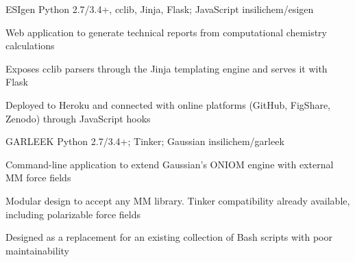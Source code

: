 \begin{cventries}
  \projectentry
    {ESIgen} %
    {Python 2.7/3.4+, cclib, Jinja, Flask; JavaScript} %
    {} %
    {insilichem/esigen} %
    {
      \begin{cvitems} %
        \item {Web application to generate technical reports from computational chemistry calculations}
        \item {Exposes cclib parsers through the Jinja templating engine and serves it with Flask}
        \item {Deployed to Heroku and connected with online platforms (GitHub, FigShare, Zenodo) through JavaScript hooks}
      \end{cvitems}
    }

  \projectentry
    {GARLEEK} %
    {Python 2.7/3.4+; Tinker; Gaussian} %
    {} %
    {insilichem/garleek} %
    {
      \begin{cvitems} %
        \item {Command-line application to extend Gaussian's ONIOM engine with external MM force fields}
        \item {Modular design to accept any MM library. Tinker compatibility already available, including polarizable force fields}
        \item {Designed as a replacement for an existing collection of Bash scripts with poor maintainability}
      \end{cvitems}
    }

\end{cventries}

